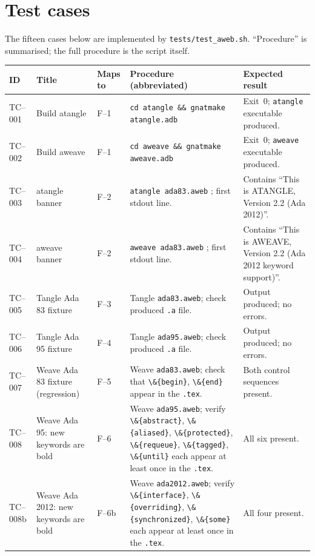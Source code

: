 \documentclass[11pt]{article}
\begin{document}
\section{Test cases}\label{sec:cases}

The fifteen cases below are implemented by
\texttt{tests/test\_aweb.sh}.  ``Procedure'' is summarised; the full
procedure is the script itself.

{\small
\begin{longtable}{@{}lp{3.5cm}lp{4.6cm}p{4.0cm}@{}}
\toprule
ID & Title & Maps to & Procedure (abbreviated) & Expected result\\
\midrule
\endhead
TC--001 & Build atangle & F--1 &
\texttt{cd atangle \&\& gnatmake atangle.adb} &
Exit~0; \texttt{atangle} executable produced.\\

TC--002 & Build aweave & F--1 &
\texttt{cd aweave \&\& gnatmake aweave.adb} &
Exit~0; \texttt{aweave} executable produced.\\

TC--003 & atangle banner & F--2 &
\texttt{atangle ada83.aweb} ; first stdout line. &
Contains ``This is ATANGLE, Version 2.2 (Ada 2012)''.\\

TC--004 & aweave banner & F--2 &
\texttt{aweave ada83.aweb} ; first stdout line. &
Contains ``This is AWEAVE, Version 2.2 (Ada 2012 keyword support)''.\\

TC--005 & Tangle Ada 83 fixture & F--3 &
Tangle \texttt{ada83.aweb}; check produced \texttt{.a} file. &
Output produced; no errors.\\

TC--006 & Tangle Ada 95 fixture & F--4 &
Tangle \texttt{ada95.aweb}; check produced \texttt{.a} file. &
Output produced; no errors.\\

TC--007 & Weave Ada 83 fixture (regression) & F--5 &
Weave \texttt{ada83.aweb}; check that
\verb|\&{begin}|, \verb|\&{end}| appear in the \texttt{.tex}. &
Both control sequences present.\\

TC--008 & Weave Ada 95: new keywords are bold & F--6 &
Weave \texttt{ada95.aweb}; verify
\verb|\&{abstract}|, \verb|\&{aliased}|, \verb|\&{protected}|,
\verb|\&{requeue}|, \verb|\&{tagged}|, \verb|\&{until}| each
appear at least once in the \texttt{.tex}. &
All six present.\\

TC--008b & Weave Ada 2012: new keywords are bold & F--6b &
Weave \texttt{ada2012.aweb}; verify
\verb|\&{interface}|, \verb|\&{overriding}|,
\verb|\&{synchronized}|, \verb|\&{some}| each
appear at least once in the \texttt{.tex}. &
All four present.\\


\end{longtable}}
\end{document}

